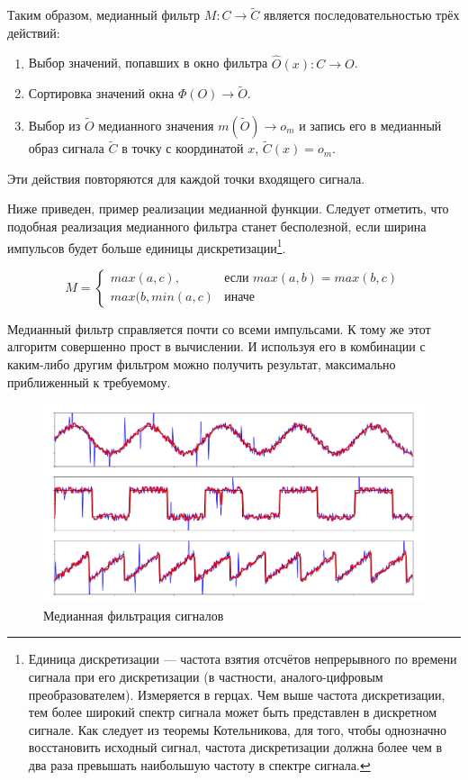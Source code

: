 Таким образом, медианный фильтр $M:C \rightarrow \widetilde{C}$ является последовательностью трёх действий:
\begin{enumerate}
	\item Выбор значений, попавших в окно фильтра $\hat{O}(x):C \rightarrow O$.
	\item Сортировка значений окна $\Phi(O) \rightarrow \widetilde{O}$.
	\item Выбор из $\widetilde{O}$ медианного значения $m(\widetilde{O}) \rightarrow o_{m}$ и запись его в медианный образ сигнала $\widetilde{C}$ в точку с координатой $x$, $\widetilde{C}(x) = o_{m} $.
\end{enumerate}
Эти действия повторяются для каждой точки входящего сигнала. \cite{med2}

Ниже приведен, пример реализации медианной функции. Следует отметить, что подобная реализация медианного фильтра станет бесполезной, если ширина импульсов будет больше единицы дискретизации\footnote{Единица дискретизации --- частота взятия отсчётов непрерывного по времени сигнала при его дискретизации (в частности, аналого-цифровым преобразователем). Измеряется в герцах. Чем выше частота дискретизации, тем более широкий спектр сигнала может быть представлен в дискретном сигнале. Как следует из теоремы Котельникова, для того, чтобы однозначно восстановить исходный сигнал, частота дискретизации должна более чем в два раза превышать наибольшую частоту в спектре сигнала.}.

\begin{equation}
	M = 
	\begin{cases}
		max(a, c), &\text{если $max(a, b) = max(b, c)$}\\
		max(b, min(a, c) &\text{иначе}
	\end{cases}
\end{equation}

Медианный фильтр справляется почти со всеми импульсами. К тому же этот алгоритм совершенно прост в вычислении. И используя его в комбинации с каким-либо другим фильтром можно получить результат, максимально приближенный к требуемому.

\begin{figure}[h]
	\begin{center}
		\includegraphics[pages=-, scale=0.32]{./inc/img/5.png}
		\caption{Медианная фильтрация сигналов}  
		\label{img_5}
	\end{center}
\end{figure}

